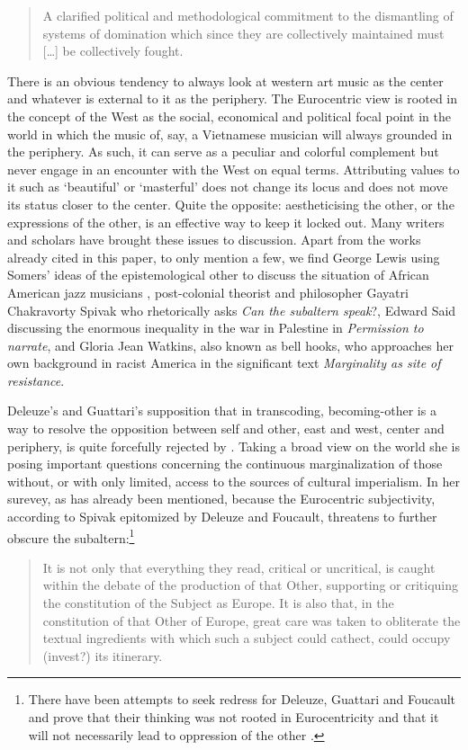 \documentclass[a4paper]{article}
\begin{document}
\begin{quote}
  A clarified political and methodological commitment to the dismantling of
  systems of domination which since they are collectively maintained must [\ldots] be collectively
  fought. \citep[p. 215]{said2000}
\end{quote}

There is an obvious tendency to always look at western art music as the center and whatever is external to it as the periphery. The Eurocentric view is rooted in the concept of the West as the social, economical and political focal point in the world in which the music of, say, a Vietnamese musician will always grounded in the periphery. As such, it can serve as a peculiar and colorful complement but never engage in an encounter with the West on equal terms. Attributing values to it such as `beautiful' or `masterful' does not change its locus and does not move its status closer to the center. Quite the opposite: aestheticising the other, or the expressions of the other, is an effective way to keep it locked out. Many writers and scholars have brought these issues to discussion. Apart from the works already cited in this paper, to only mention a few, we find George Lewis using Somers' ideas of the epistemological other to discuss the situation of African American jazz musicians \citep{lewis-1}, post-colonial theorist and philosopher Gayatri Chakravorty Spivak who rhetorically asks \emph{Can the subaltern speak}?, Edward Said discussing the enormous inequality in the war in Palestine in \emph{Permission to narrate}, and Gloria Jean Watkins, also known as bell hooks, who approaches her own background in racist America in the significant text \emph{Marginality as site of resistance}\cite{HooksBell1990}. 

Deleuze's and Guattari's supposition that in transcoding, becoming-other is a way to resolve the opposition between self and other, east and west, center and periphery, is quite forcefully rejected by  \citet{spivak1988}. Taking a broad view on the world she is posing important questions concerning the continuous marginalization of those without, or with only limited, access to the sources of cultural imperialism. In her surevey, as has already been mentioned, because the Eurocentric subjectivity, according to Spivak epitomized by Deleuze and Foucault, threatens to further obscure the subaltern:\footnote{There have been attempts to seek redress for Deleuze, Guattari and Foucault and prove that their thinking was not rooted in Eurocentricity and that it will not necessarily lead to oppression of the other \citep[See e.g.][]{robinson2010}. }
\begin{quote}
  It is not only that everything they read, critical or uncritical, is caught within the debate   of the production of that Other, supporting or critiquing the constitution of the Subject as   Europe.  It is also that, in the constitution of that Other of Europe, great care was taken to   obliterate the textual ingredients with which such a subject could cathect, could occupy (invest?) its   itinerary. \citep[p. 75]{spivak1988}
\end{quote}
\end{document}
